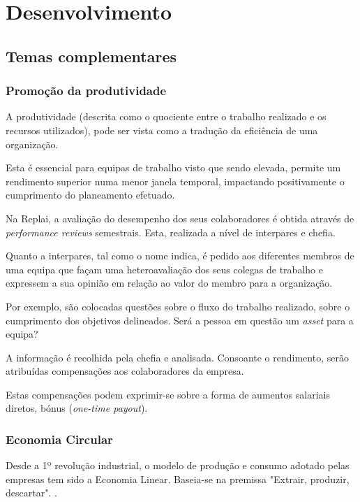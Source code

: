 \chapter{Desenvolvimento}

\section{Temas complementares}

\subsection{Promoção da produtividade}
\label{section: produtividade}

A produtividade (descrita como o quociente entre o trabalho realizado e os recursos utilizados), pode ser vista como a tradução da  eficiência de uma organização.


Esta é essencial para equipas de trabalho visto que sendo elevada, permite um rendimento superior numa menor janela temporal, impactando positivamente o cumprimento do planeamento efetuado.
  
Na Replai, a avaliação do desempenho dos seus colaboradores é obtida através de \textit{performance reviews} semestrais. 
Esta, realizada a nível de interpares e chefia.  
  
Quanto a interpares, tal como o nome indica, é pedido aos diferentes membros de uma equipa que façam uma heteroavaliação dos seus colegas de trabalho e expressem a sua opinião em relação ao valor do membro para a organização.  
  
Por exemplo, são colocadas questões sobre o fluxo do trabalho realizado, sobre o cumprimento dos objetivos delineados. Será a pessoa em questão um \textit{asset} para a equipa?
  
A informação é recolhida pela chefia e analisada. Consoante o rendimento, serão atribuídas compensações aos colaboradores da empresa.
  
Estas compensações podem exprimir-se sobre a forma de aumentos salariais diretos, bónus (\textit{one-time payout}).



\subsection{Economia Circular}
Desde a 1º revolução industrial, o modelo de produção e consumo adotado pelas empresas tem sido a Economia Linear. Baseia-se na premissa "Extrair, produzir, descartar".
\cite{EconomiaLinear}.

